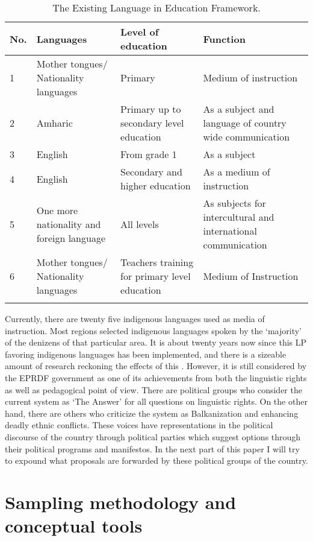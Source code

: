 \documentclass[output=paper,modfonts]{langscibook}
\begin{document}
\begin{table}
\begin{tabularx}{\textwidth}{lQQQ}
\lsptoprule
{\bfseries No.} & {\bfseries Languages} & {\bfseries Level of education} & {\bfseries Function}\\
\midrule 
{1} & {Mother tongues/ Nationality languages} & {Primary}  & {Medium of instruction}\\
\tablevspace 
{2} & {Amharic} & {Primary up to secondary level education} & {As a subject and language of country wide communication}\\
\tablevspace 
{3} & {English} & {From grade 1} & {As a subject}\\
\tablevspace 
{4} & {English} & {Secondary and higher education}  & {As a medium of instruction}\\
\tablevspace 
{5} & {One more nationality and foreign language} & {All levels} & {As subjects for intercultural and international communication} \\
\tablevspace 
{6} & {Mother tongues/ Nationality languages} & {Teachers training for primary level education} & {Medium of Instruction}\\
\lspbottomrule
\end{tabularx}
\caption{The Existing Language in Education Framework.}
\label{tab:zemelak:2}
\end{table} 

Currently, there are twenty five indigenous languages used as media of instruction. Most regions selected indigenous languages spoken by the ‘majority’ of the denizens of that particular area. It is about twenty years now since this LP favoring indigenous languages has been implemented, and there is a sizeable amount of research reckoning the effects of this . However, it is still considered by the EPRDF government as one of its achievements from both the linguistic rights as well as pedagogical point of view. There are political groups who consider the current system as ‘The Answer’ for all questions on linguistic rights. On the other hand, there are others who criticize the system as Balkanization and enhancing deadly ethnic conflicts. These voices have representations in the political discourse of the country through political parties which suggest options through their political programs and manifestos. In the next part of this paper I will try to expound what  proposals are forwarded by these political groups of the country.
 
\section{Sampling methodology and conceptual tools} 
\end{document}
